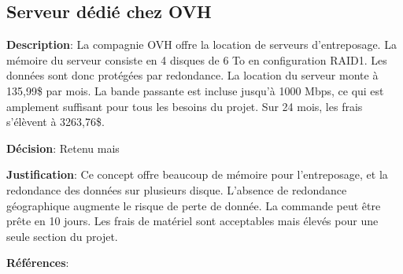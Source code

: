 

\subsection{Serveur dédié chez OVH}
\label{s:archiver_conc4}

\textbf{Description}: La compagnie OVH offre la location de serveurs d’entreposage. La mémoire du serveur consiste en 4 disques de 6 To en configuration RAID1. Les données sont donc protégées par redondance. La location du serveur monte à 135,99\$ par mois. La bande passante est incluse jusqu’à 1000 Mbps, ce qui est amplement suffisant pour tous les besoins du projet. Sur 24 mois, les frais s’élèvent à 3263,76\$.
 
\textbf{Décision}: Retenu mais

\textbf{Justification}: Ce concept offre beaucoup de mémoire pour l’entreposage, et la redondance des données sur plusieurs disque. L’absence de redondance géographique augmente le risque de perte de donnée. La commande peut être prête en 10 jours. Les frais de matériel sont acceptables mais élevés pour une seule section du projet.

\textbf{Références}: 
\cite{siteOVH}

